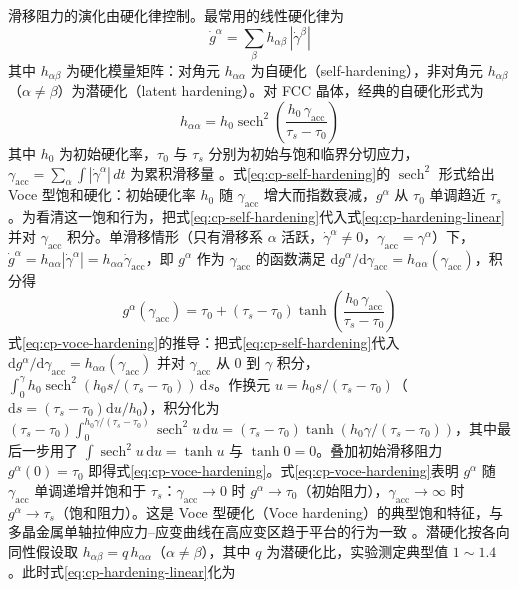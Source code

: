 滑移阻力的演化由硬化律控制。最常用的线性硬化律为
\begin{equation}
  \dot{g}^{\alpha}=\sum_{\beta}h_{\alpha\beta}\,|\dot{\gamma}^{\beta}|
  \label{eq:cp-hardening-linear}
\end{equation}
其中 $h_{\alpha\beta}$ 为硬化模量矩阵：对角元 $h_{\alpha\alpha}$ 为自硬化（self-hardening），非对角元 $h_{\alpha\beta}$（$\alpha\neq\beta$）为潜硬化（latent hardening）\cite{Asaro1983}。对 FCC 晶体，经典的自硬化形式为
\begin{equation}
  h_{\alpha\alpha}=h_{0}\operatorname{sech}^{2}\!\left(\frac{h_{0}\,\gamma_{\mathrm{acc}}}{\tau_{s}-\tau_{0}}\right)
  \label{eq:cp-self-hardening}
\end{equation}
其中 $h_{0}$ 为初始硬化率，$\tau_{0}$ 与 $\tau_{s}$ 分别为初始与饱和临界分切应力，$\gamma_{\mathrm{acc}}=\sum_{\alpha}\int|\dot{\gamma}^{\alpha}|\,dt$ 为累积滑移量 \cite{Peirce1982}。式\eqref{eq:cp-self-hardening}的 $\operatorname{sech}^{2}$ 形式给出 Voce 型饱和硬化：初始硬化率 $h_{0}$ 随 $\gamma_{\mathrm{acc}}$ 增大而指数衰减，$g^{\alpha}$ 从 $\tau_{0}$ 单调趋近 $\tau_{s}$。为看清这一饱和行为，把式\eqref{eq:cp-self-hardening}代入式\eqref{eq:cp-hardening-linear}并对 $\gamma_{\mathrm{acc}}$ 积分。单滑移情形（只有滑移系 $\alpha$ 活跃，$\dot{\gamma}^{\alpha}\ne0$，$\gamma_{\mathrm{acc}}=\gamma^{\alpha}$）下，$\dot{g}^{\alpha}=h_{\alpha\alpha}|\dot{\gamma}^{\alpha}|=h_{\alpha\alpha}\dot{\gamma}_{\mathrm{acc}}$，即 $g^{\alpha}$ 作为 $\gamma_{\mathrm{acc}}$ 的函数满足 $\mathrm{d}g^{\alpha}/\mathrm{d}\gamma_{\mathrm{acc}}=h_{\alpha\alpha}(\gamma_{\mathrm{acc}})$，积分得
\begin{equation}
  g^{\alpha}(\gamma_{\mathrm{acc}})
  =\tau_{0}+(\tau_{s}-\tau_{0})
  \tanh\!\left(\frac{h_{0}\,\gamma_{\mathrm{acc}}}{\tau_{s}-\tau_{0}}\right)
  \label{eq:cp-voce-hardening}
\end{equation}
式\eqref{eq:cp-voce-hardening}的推导：把式\eqref{eq:cp-self-hardening}代入 $\mathrm{d}g^{\alpha}/\mathrm{d}\gamma_{\mathrm{acc}}=h_{\alpha\alpha}(\gamma_{\mathrm{acc}})$ 并对 $\gamma_{\mathrm{acc}}$ 从 $0$ 到 $\gamma$ 积分，$\int_{0}^{\gamma}h_{0}\operatorname{sech}^{2}(h_{0}s/(\tau_{s}-\tau_{0}))\,\mathrm{d}s$。作换元 $u=h_{0}s/(\tau_{s}-\tau_{0})$（$\mathrm{d}s=(\tau_{s}-\tau_{0})\mathrm{d}u/h_{0}$），积分化为 $(\tau_{s}-\tau_{0})\int_{0}^{h_{0}\gamma/(\tau_{s}-\tau_{0})}\operatorname{sech}^{2}u\,\mathrm{d}u=(\tau_{s}-\tau_{0})\tanh(h_{0}\gamma/(\tau_{s}-\tau_{0}))$，其中最后一步用了 $\int\operatorname{sech}^{2}u\,\mathrm{d}u=\tanh u$ 与 $\tanh0=0$。叠加初始滑移阻力 $g^{\alpha}(0)=\tau_{0}$ 即得式\eqref{eq:cp-voce-hardening}。式\eqref{eq:cp-voce-hardening}表明 $g^{\alpha}$ 随 $\gamma_{\mathrm{acc}}$ 单调递增并饱和于 $\tau_{s}$：$\gamma_{\mathrm{acc}}\to0$ 时 $g^{\alpha}\to\tau_{0}$（初始阻力），$\gamma_{\mathrm{acc}}\to\infty$ 时 $g^{\alpha}\to\tau_{s}$（饱和阻力）。这是 Voce 型硬化（Voce hardening）的典型饱和特征，与多晶金属单轴拉伸应力--应变曲线在高应变区趋于平台的行为一致 \cite{Peirce1982}。潜硬化按各向同性假设取 $h_{\alpha\beta}=q\,h_{\alpha\alpha}$（$\alpha\neq\beta$），其中 $q$ 为潜硬化比，实验测定典型值 $1\sim1.4$ \cite{Peirce1982,Asaro1983}。此时式\eqref{eq:cp-hardening-linear}化为
